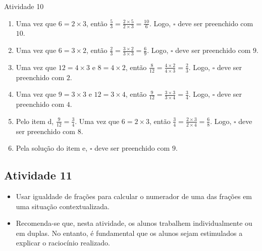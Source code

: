 \begin{multicols}{2}
\begin{resposta*}{Atividade 10}
\begin{enumerate} [\quad a)] %
    \item       Uma vez que       $6 = 2 \times 3$, então       $\frac{5}{3} =
\frac{2 \times 5}{2 \times 3} = \frac{10}{6}$. Logo,       $\square$       deve
ser preenchido com       $10$.
    \item       Uma vez que       $6 = 3 \times 2$, então       $\frac{2}{3} =
\frac{3 \times 2}{3 \times 3} = \frac{6}{9}$. Logo,       $\square$       deve
ser preenchido com       $9$.
    \item       Uma vez que       $12 = 4 \times 3$       e       $8 = 4 \times
2$, então       $\frac{8}{12} = \frac{4 \times 2}{4 \times 3} = \frac{2}{3}$.
Logo,       $\square$       deve ser preenchido com       $2$.
    \item       Uma vez que       $9 = 3 \times 3$       e       $12 = 3 \times
4$, então       $\frac{9}{12} = \frac{3 \times 3}{3 \times 4} = \frac{3}{4}$.
Logo,       $\square$       deve ser preenchido com       $4$.
    \item       Pelo item d,       $\frac{9}{12} = \frac{3}{4}$. Uma vez que
  $6 = 2 \times 3$, então       $\frac{3}{4} = \frac{2 \times 3}{2 \times 4} =
\frac{6}{8}$. Logo,       $\square$       deve ser preenchido com       $8$.
    \item       Pela solução do item e,       $\square$       deve ser
preenchido com       $9$.
\end{enumerate} %

\end{resposta*}



\subsection{Atividade 11}

\begin{itemize} %
    \item       Usar igualdade de frações para calcular o numerador de uma das
frações em uma situação contextualizada.
\end{itemize} %


\begin{itemize} %
    \item       Recomenda-se que, nesta atividade, os alunos trabalhem
individualmente ou em duplas. No entanto, é fundamental que os alunos sejam
estimulados a explicar o raciocínio realizado.
\end{itemize} %


\end{multicols}
